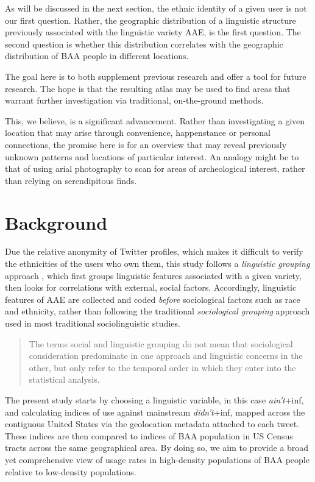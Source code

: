 \documentclass[output=paper,colorlinks,citecolor=brown,draftmode]{langscibook}
\begin{document}
As will be discussed in the next section, the ethnic identity of a given user is not our first question. Rather, the geographic distribution of a linguistic structure previously associated with the linguistic variety AAE, is the first question. The second question is whether this distribution correlates with the geographic distribution of BAA people in different locations.

The goal here is to both supplement previous research and offer a tool for future research. The hope is that the resulting atlas may be used to find areas that warrant further investigation via traditional, on-the-ground methods. 

This, we believe, is a significant advancement. Rather than investigating a given location that may arise through convenience, happenstance or personal connections, the promise here is for an overview that may reveal previously unknown patterns and locations of particular interest. An analogy might be to that of using arial photography to scan for areas of archeological interest, rather than relying on serendipitous finds.

\section{Background}
Due the relative anonymity of Twitter profiles, which makes it difficult to verify the ethnicities of the users who own them, this study follows a \textit{linguistic grouping} approach \citep{horvath1987}, which first groups linguistic features associated with a given variety, then looks for correlations with external, social factors. Accordingly, linguistic features of AAE are collected and coded \textit{before} sociological factors such as race and ethnicity, rather than following the traditional \textit{sociological grouping} approach used in most traditional sociolinguistic studies.

\begin{quotation}
The terms social and linguistic grouping do not mean that sociological consideration predominate in one approach and linguistic concerns in the other, but only refer to the temporal order in which they enter into the statistical analysis. \citep[180]{horvath1987}
\end{quotation}

The present study starts by choosing a linguistic variable, in this case \textit{ain't}+inf, and calculating indices of use against mainstream \textit{didn't}+inf, mapped across the contiguous United States via the geolocation metadata attached to each tweet. These indices are then compared to indices of BAA population in US Census tracts across the same geographical area. By doing so, we aim to provide a broad yet comprehensive view of usage rates in high-density populations of BAA people relative to low-density populations.
\end{document}
